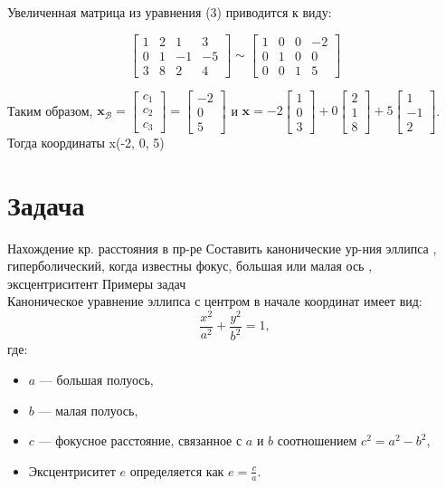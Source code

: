 \documentclass[a4paper,14pt]{extreport} %
\begin{document}
Увеличенная матрица из уравнения (3) приводится к виду:

\[ \begin{bmatrix} 1 & 2 & 1 & 3 \\ 0 & 1 & -1 & -5 \\ 3 & 8 & 2 & 4 \end{bmatrix} \sim \begin{bmatrix} 1 & 0 & 0 & -2 \\ 0 & 1 & 0 & 0 \\ 0 & 0 & 1 & 5 \end{bmatrix} \]

Таким образом, \(\mathbf{x}_{\mathcal{B}} = \begin{bmatrix} c_1 \\ c_2 \\ c_3 \end{bmatrix} = \begin{bmatrix} -2 \\ 0 \\ 5 \end{bmatrix}\) и \(\mathbf{x} = -2 \begin{bmatrix} 1 \\ 0 \\ 3 \end{bmatrix} + 0 \begin{bmatrix} 2 \\ 1 \\ 8 \end{bmatrix} + 5 \begin{bmatrix} 1 \\ -1 \\ 2 \end{bmatrix}\).
Тогда координаты x(-2, 0, 5)
\section*{Задача}
Нахождение кр. расстояния в пр-ре 
Составить канонические ур-ния эллипса , гиперболический, 
когда известны фокус, большая или малая ось , эксцентриситент 
Примеры задач\\

Каноническое уравнение эллипса с центром в начале координат имеет вид:
\[
\frac{x^2}{a^2} + \frac{y^2}{b^2} = 1,
\]
где:
\begin{itemize}
    \item \(a\) — большая полуось,
    \item \(b\) — малая полуось,
    \item \(c\) — фокусное расстояние, связанное с \(a\) и \(b\) соотношением \(c^2 = a^2 - b^2\),
    \item Эксцентриситет \(e\) определяется как \(e = \frac{c}{a}\).
\end{itemize}
\end{document}
